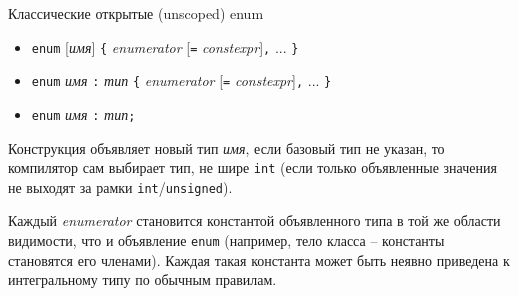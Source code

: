 \documentclass[unknownkeysallowed,xcolor=table]{beamer}
\begin{document}
\begin{frame}[fragile]{Классические открытые (unscoped) enum}

\begin{itemize}
  \item \lstinline{enum} [\emph{имя}] \lstinline|{| \emph{enumerator} [\lstinline{=} \emph{constexpr}]\lstinline{,} ... \lstinline|}|
  \item \lstinline{enum} \emph{имя} \lstinline{:} \emph{тип} \lstinline|{| \emph{enumerator} [\lstinline{=} \emph{constexpr}]\lstinline{,} ... \lstinline|}|
  \item \lstinline{enum} \emph{имя} \lstinline{:} \emph{тип}\lstinline{;}
\end{itemize}

\vspace{0.5em}

Конструкция объявляет новый тип \emph{имя}, если базовый тип не указан, то компилятор сам выбирает тип, не шире \lstinline{int} (если только объявленные значения не выходят за рамки \lstinline{int}/\lstinline{unsigned}).

\vspace{0.5em}

Каждый \emph{enumerator} становится константой объявленного типа в той же области видимости, что и объявление \lstinline{enum} (например, тело класса -- константы становятся его членами). Каждая такая константа может быть неявно приведена к интегральному типу по обычным правилам.

\end{frame}
\end{document}
